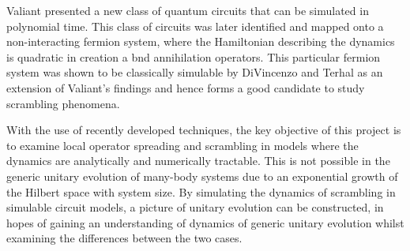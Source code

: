 Valiant \cite{Valiant2001QuantumCT} presented a new class of quantum circuits that can be simulated in
polynomial time. This class of circuits was later identified and mapped onto a non-interacting fermion system, where the Hamiltonian
describing the dynamics is quadratic in creation a bnd annihilation operators. This particular fermion
system was shown to be classically simulable by DiVincenzo and Terhal \cite{Terhal2001} as an extension of Valiant's findings and
hence forms a good candidate to study scrambling phenomena.

With the use of recently developed techniques, the key objective of this project is to examine local
operator spreading and scrambling in models where the dynamics are analytically and numerically tractable. This is not
possible in the generic unitary evolution of many-body systems due to an exponential growth of
the Hilbert space with system size. By simulating the dynamics of scrambling in simulable circuit models, a picture of unitary evolution
can be constructed, in hopes of gaining an understanding of dynamics of generic unitary evolution
whilst examining the differences between the two cases.



